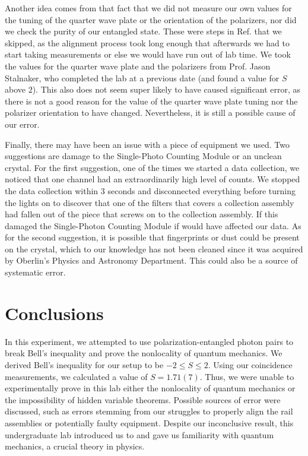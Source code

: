 \documentclass[11pt,letterpaper]{article}
\begin{document}
Another idea comes from that fact that we did not measure our own values for the tuning of the quarter wave plate or the orientation of the polarizers, nor did we check the purity of our entangled state. These were steps in Ref. \cite{Lab manual} that we skipped, as the alignment process took long enough that afterwards we had to start taking measurements or else we would have run out of lab time. We took the values for the quarter wave plate and the polarizers from Prof. Jason Stalnaker, who completed the lab at a previous date (and found a value for $S$ above $2$). This also does not seem super likely to have caused significant error, as there is not a good reason for the value of the quarter wave plate tuning nor the polarizer orientation to have changed. Nevertheless, it is still a possible cause of our error.

Finally, there may have been an issue with a piece of equipment we used. Two suggestions are damage to the Single-Photo Counting Module or an unclean crystal. For the first suggestion, one of the times we started a data collection, we noticed that one channel had an extraordinarily high level of counts. We stopped the data collection within $3$ seconds and disconnected everything before turning the lights on to discover that one of the filters that covers a collection assembly had fallen out of the piece that screws on to the collection assembly. If this damaged the Single-Photon Counting Module if would have affected our data. As for the second suggestion, it is possible that fingerprints or dust could be present on the crystal, which to our knowledge has not been cleaned since it was acquired by Oberlin's Physics and Astronomy Department. This could also be a source of systematic error.


\section{Conclusions}

In this experiment, we attempted to use polarization-entangled photon pairs to break Bell's inequality and prove the nonlocality of quantum mechanics. We derived Bell's inequality for our setup to be $-2 \le S \le 2$. Using our coincidence measurements, we calculated a value of $S = 1.71(7)$. Thus, we were unable to experimentally prove in this lab either the nonlocality of quantum mechanics or the impossibility of hidden variable theorems. Possible sources of error were discussed, such as errors stemming from our struggles to properly align the rail assemblies or potentially faulty equipment. Despite our inconclusive result, this undergraduate lab introduced us to and gave us familiarity with quantum mechanics, a crucial theory in physics.
\end{document}
